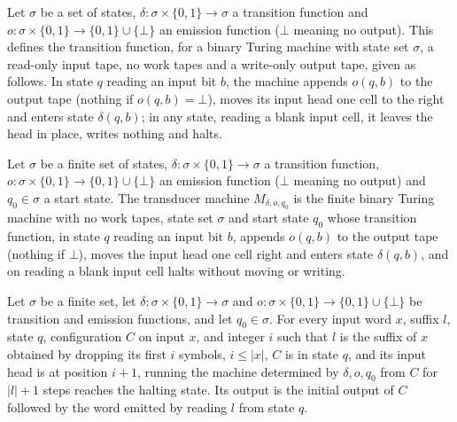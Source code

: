 \begin{definition}
\label{Complexity.transducerTr}
\leanok
{}
Let $\sigma$ be a set of states, $\delta : \sigma \times \{0,1\} \to \sigma$ a transition
function and $o : \sigma \times \{0,1\} \to \{0,1\} \cup \{\bot\}$ an emission function
($\bot$ meaning no output). This defines the transition function, for a binary Turing
machine with state set $\sigma$, a read-only input tape, no work tapes and a write-only
output tape, given as follows. In state $q$ reading an input bit $b$, the machine appends
$o(q,b)$ to the output tape (nothing if $o(q,b) = \bot$), moves its input head one cell
to the right and enters state $\delta(q,b)$; in any state, reading a blank input cell, it
leaves the head in place, writes nothing and halts.
\end{definition}

\begin{definition}
\label{Complexity.transducerTM}
\leanok
{}
Let $\sigma$ be a finite set of states, $\delta : \sigma \times \{0,1\} \to \sigma$ a
transition function, $o : \sigma \times \{0,1\} \to \{0,1\} \cup \{\bot\}$ an emission
function ($\bot$ meaning no output) and $q_0 \in \sigma$ a start state. The transducer
machine $M_{\delta,o,q_0}$ is the finite binary Turing machine with no work tapes, state
set $\sigma$ and start state $q_0$ whose transition function, in state $q$ reading an input
bit $b$, appends $o(q,b)$ to the output tape (nothing if $\bot$), moves the input head one
cell right and enters state $\delta(q,b)$, and on reading a blank input cell halts without
moving or writing.
\end{definition}

\begin{theorem}
\label{Complexity.transducer_run}
\leanok
{}
Let $\sigma$ be a finite set, let $\delta : \sigma \times \{0,1\} \to \sigma$ and $o :
\sigma \times \{0,1\} \to \{0,1\} \cup \{\bot\}$ be transition and emission functions,
and let $q_0 \in \sigma$. For every input word $x$, suffix $l$, state $q$, configuration
$C$ on input $x$, and integer $i$ such that $l$ is the suffix of $x$ obtained by
dropping its first $i$ symbols, $i \le |x|$, $C$ is in state $q$, and its input head is
at position $i+1$, running the machine determined by $\delta,o,q_0$ from $C$ for $|l|+1$
steps reaches the halting state. Its output is the initial output of $C$ followed by the
word emitted by reading $l$ from state $q$.
\end{theorem}

